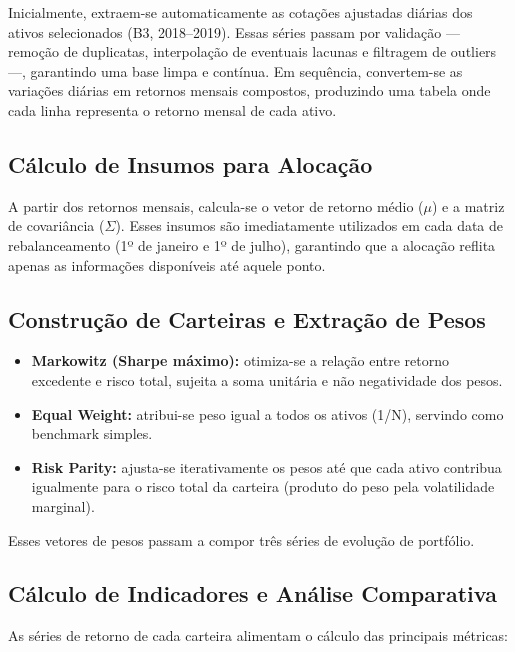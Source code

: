 Inicialmente, extraem-se automaticamente as cotações ajustadas diárias dos ativos selecionados (B3, 2018--2019). Essas séries passam por validação --- remoção de duplicatas, interpolação de eventuais lacunas e filtragem de outliers ---, garantindo uma base limpa e contínua. Em sequência, convertem-se as variações diárias em retornos mensais compostos, produzindo uma tabela onde cada linha representa o retorno mensal de cada ativo.

\subsection{Cálculo de Insumos para Alocação}

A partir dos retornos mensais, calcula-se o vetor de retorno médio ($\mu$) e a matriz de covariância ($\Sigma$). Esses insumos são imediatamente utilizados em cada data de rebalanceamento (1º de janeiro e 1º de julho), garantindo que a alocação reflita apenas as informações disponíveis até aquele ponto.

\subsection{Construção de Carteiras e Extração de Pesos}

\begin{itemize}
    \item \textbf{Markowitz (Sharpe máximo):} otimiza-se a relação entre retorno excedente e risco total, sujeita a soma unitária e não negatividade dos pesos.
    
    \item \textbf{Equal Weight:} atribui-se peso igual a todos os ativos (1/N), servindo como benchmark simples.
    
    \item \textbf{Risk Parity:} ajusta-se iterativamente os pesos até que cada ativo contribua igualmente para o risco total da carteira (produto do peso pela volatilidade marginal).
\end{itemize}

Esses vetores de pesos passam a compor três séries de evolução de portfólio.

\subsection{Cálculo de Indicadores e Análise Comparativa}

As séries de retorno de cada carteira alimentam o cálculo das principais métricas:

